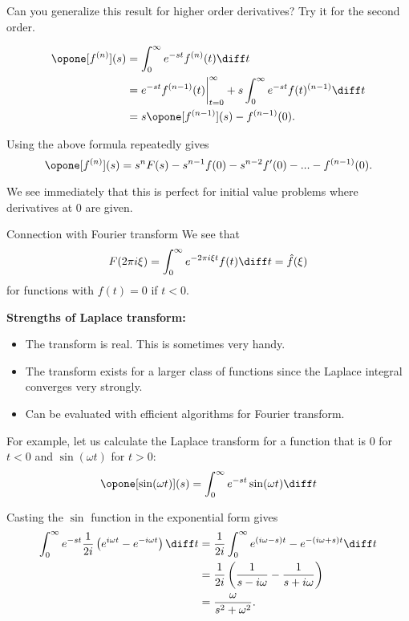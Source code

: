 \begin{frame}
	Can you generalize this result for higher order derivatives? Try it for the second order.
	
	\pause
	\[ \begin{split}
	\opone [f^{(n)}](s) &= \int_{0}^{\infty} e^{-st} f^{(n)}(t) \diff t   \\
	& = e^{-st} f^{(n-1)}(t)\biggr|_{t=0}^{\infty} + s \int_{0}^{\infty} e^{-st} f(t)^{(n-1)} \diff t \\
	&=   s \opone [f^{(n-1)}](s)-f^{(n-1)}(0).
	\end{split}
	\]
	
	\pause
	Using the above formula repeatedly gives
	\[ \opone [f^{(n)}](s) = s^{n} F(s) - s^{n-1} f(0) - s^{n-2} f'(0) - ... - f^{(n-1)}(0).  \]
	
	\pause
	We see immediately that this is perfect for initial value problems where derivatives at $ 0 $ are given. 
\end{frame}

\begin{frame}{Connection with Fourier transform}
	We see that 
	\[ F(2\pi i \xi) = \int_{0}^{\infty} e^{-2\pi i \xi t} f(t) \diff t = \hat{f}(\xi) \]
	for functions with $ f(t) = 0  $ if $ t<0 $.
	
	\pause
	\textbf{Strengths of Laplace transform:}
	\begin{itemize}[<+->]
		\item The transform is real. This is sometimes very handy.
		\item The transform exists for a larger class of functions since the Laplace integral converges very strongly.
		\item Can be evaluated with efficient algorithms for Fourier transform.
	\end{itemize}
\end{frame}

\begin{frame}
	For example, let us calculate the Laplace transform for a function that is $ 0 $ for $ t<0 $ and $ \sin(\omega t) $ for $ t>0 $:
	\[ \opone[\sin(\omega t)](s) = \int_{0}^{\infty} e^{-st} \sin(\omega t) \diff t \]
	
	\pause
	Casting the $ \sin $ function in the exponential form gives 
	\[  
	\begin{split}
		\int_{0}^{\infty} e^{-st} \frac{1}{2i} \left( e^{i \omega t} - e^{-i\omega t} \right) \diff t
		 &= \frac{1}{2i} \int_{0}^{\infty} e^{(i \omega - s)t } - e^{-(i\omega + s)t } \diff t \\
		 &= \frac{1}{2i} \left( \frac{1}{s-i\omega} - \frac{1}{s + i \omega} \right) \\
		 &= \frac{\omega}{s^2 + \omega^2}.
	\end{split}
	\]
\end{frame}

